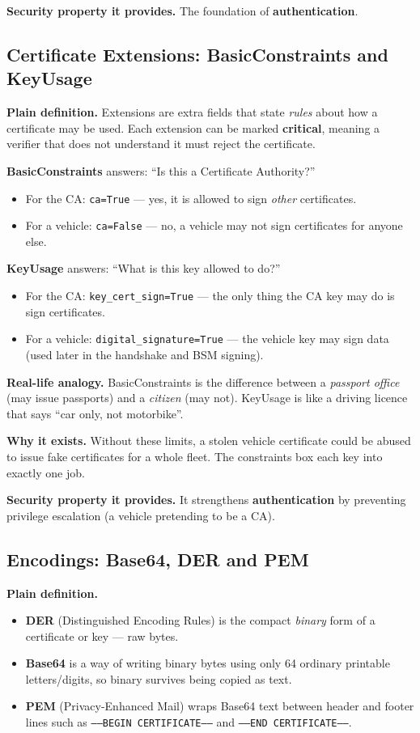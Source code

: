 \documentclass[11pt,a4paper]{report}
\begin{document}
\textbf{Security property it provides.} The foundation of \textbf{authentication}.

\subsection{Certificate Extensions: BasicConstraints and KeyUsage}
\textbf{Plain definition.} Extensions are extra fields that state \emph{rules}
about how a certificate may be used. Each extension can be marked
\textbf{critical}, meaning a verifier that does not understand it must reject the
certificate.

\textbf{BasicConstraints} answers: ``Is this a Certificate Authority?''
\begin{itemize}
  \item For the CA: \texttt{ca=True} --- yes, it is allowed to sign \emph{other}
        certificates.
  \item For a vehicle: \texttt{ca=False} --- no, a vehicle may not sign
        certificates for anyone else.
\end{itemize}

\textbf{KeyUsage} answers: ``What is this key allowed to do?''
\begin{itemize}
  \item For the CA: \texttt{key\_cert\_sign=True} --- the only thing the CA key
        may do is sign certificates.
  \item For a vehicle: \texttt{digital\_signature=True} --- the vehicle key may
        sign data (used later in the handshake and BSM signing).
\end{itemize}

\textbf{Real-life analogy.} BasicConstraints is the difference between a
\emph{passport office} (may issue passports) and a \emph{citizen} (may not).
KeyUsage is like a driving licence that says ``car only, not motorbike''.

\textbf{Why it exists.} Without these limits, a stolen vehicle certificate could
be abused to issue fake certificates for a whole fleet. The constraints box each
key into exactly one job.

\textbf{Security property it provides.} It strengthens \textbf{authentication}
by preventing privilege escalation (a vehicle pretending to be a CA).

\subsection{Encodings: Base64, DER and PEM}
\textbf{Plain definition.}
\begin{itemize}
  \item \textbf{DER} (Distinguished Encoding Rules) is the compact \emph{binary}
        form of a certificate or key --- raw bytes.
  \item \textbf{Base64} is a way of writing binary bytes using only 64 ordinary
        printable letters/digits, so binary survives being copied as text.
  \item \textbf{PEM} (Privacy-Enhanced Mail) wraps Base64 text between header and
        footer lines such as \texttt{-----BEGIN CERTIFICATE-----} and
        \texttt{-----END CERTIFICATE-----}.
\end{itemize}
\end{document}

